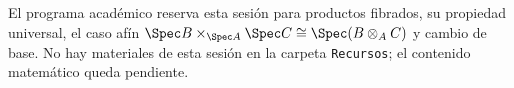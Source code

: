 \begin{nota}
El programa académico reserva esta sesión para productos fibrados, su propiedad universal, el caso afín $\Spec B\times_{\Spec A}\Spec C\cong\Spec(B\otimes_A C)$ y cambio de base. No hay materiales de esta sesión en la carpeta \texttt{Recursos}; el contenido matemático queda pendiente.
\end{nota}
